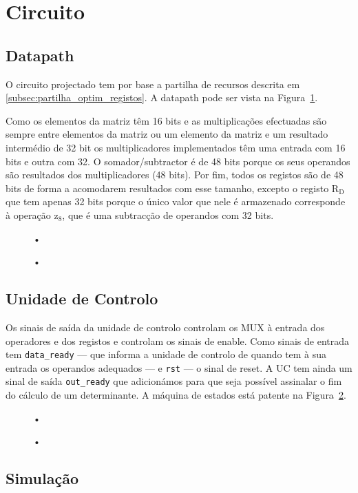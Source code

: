 \documentclass[a4paper]{article}
\begin{document}
\section{Circuito}
\subsection{Datapath}

O circuito projectado tem por base a partilha de recursos descrita em \ref{subsec:partilha_optim_registos}. A datapath pode ser vista na Figura~\ref{fig:datapath_original}.

Como os elementos da matriz têm 16 bits e as multiplicações efectuadas são sempre entre elementos da matriz ou um elemento da matriz e um resultado intermédio de 32 bit os multiplicadores implementados têm uma entrada com 16 bits e outra com 32. O somador/subtractor é de 48 bits porque os seus operandos são resultados dos multiplicadores (48 bits). Por fim, todos os registos são de 48 bits de forma a acomodarem resultados com esse tamanho, excepto o registo $\mathrm{R_D}$ que tem apenas 32 bits porque o único valor que nele é armazenado corresponde à operação $\mathrm{z_8}$, que é uma subtracção de operandos com 32 bits.

\begin{figure}
\centering
•
\caption{•}
\label{fig:datapath_original}
\end{figure}

\subsection{Unidade de Controlo}

Os sinais de saída da unidade de controlo controlam os MUX à entrada dos operadores e dos registos e controlam os sinais de enable. Como sinais de entrada tem \texttt{data\_ready} --- que informa a unidade de controlo de quando tem à sua entrada os operandos adequados --- e \texttt{rst} --- o sinal de reset. A UC tem ainda um sinal de saída \texttt{out\_ready} que adicionámos para que seja possível assinalar o fim do cálculo de um determinante. A máquina de estados está patente na Figura~\ref{fig:statemachine}.

\begin{figure}[h]
\centering
•
\caption{•}
\label{fig:statemachine}
\end{figure}

\subsection{Simulação}
\end{document}
